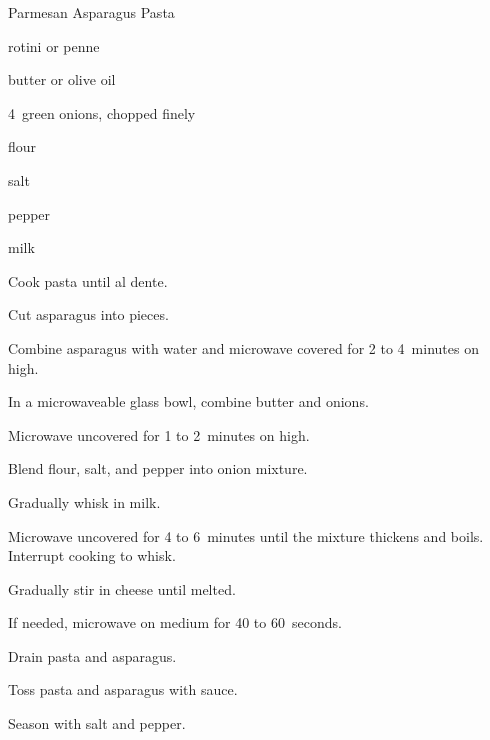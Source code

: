 \begin{recipe}{Parmesan Asparagus Pasta}{}{}

\begin{ingredients}
\item {} rotini or penne
\item \lbs{\half} 
\item {} butter or olive oil
\item 4~green onions, chopped finely
\item {} flour
\item salt
\item pepper
\item \C{1\half} milk
\item {} 
\end{ingredients}

\begin{directions}
\item Cook pasta until al dente.
\item Cut asparagus into \inch{\half} pieces.
\item Combine asparagus with  water and microwave covered for 2 to 4~minutes on high.
\item In a  microwaveable glass bowl, combine butter and onions.
\item Microwave uncovered for 1 to 2~minutes on high.
\item Blend flour, salt, and pepper into onion mixture.
\item Gradually whisk in milk.
\item Microwave uncovered for 4 to 6~minutes until the mixture thickens and boils. Interrupt cooking to whisk.
\item Gradually stir in cheese until melted.
\item If needed, microwave on medium for 40 to 60~seconds.
\item Drain pasta and asparagus.
\item Toss pasta and asparagus with sauce.
\item Season with salt and pepper.
\end{directions}

\end{recipe}
